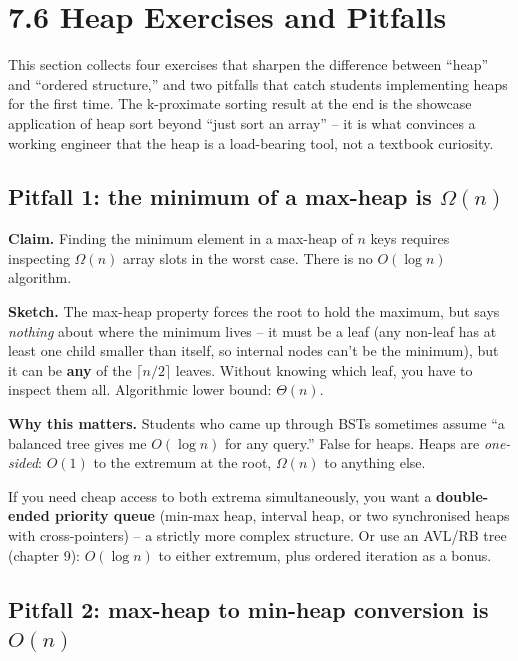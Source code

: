 \documentclass[11pt]{article}
\begin{document}
\section{7.6 Heap Exercises and Pitfalls}

This section collects four exercises that sharpen the difference
between ``heap'' and ``ordered structure,'' and two pitfalls that
catch students implementing heaps for the first time. The k-proximate
sorting result at the end is the showcase application of heap sort
beyond ``just sort an array'' -- it is what convinces a working
engineer that the heap is a load-bearing tool, not a textbook
curiosity.

\subsection*{Pitfall 1: the minimum of a max-heap is $\Omega(n)$}

\begin{warnbox}
\textbf{Claim.} Finding the minimum element in a max-heap of $n$ keys
requires inspecting $\Omega(n)$ array slots in the worst case. There
is no $O(\log n)$ algorithm.

\textbf{Sketch.} The max-heap property forces the root to hold the
maximum, but says \emph{nothing} about where the minimum lives -- it
must be a leaf (any non-leaf has at least one child smaller than
itself, so internal nodes can't be the minimum), but it can be
\textbf{any} of the $\lceil n/2 \rceil$ leaves. Without knowing
which leaf, you have to inspect them all. Algorithmic lower bound:
$\Theta(n)$.

\textbf{Why this matters.} Students who came up through BSTs
sometimes assume ``a balanced tree gives me $O(\log n)$ for any
query.'' False for heaps. Heaps are \emph{one-sided}: $O(1)$ to the
extremum at the root, $\Omega(n)$ to anything else.

If you need cheap access to both extrema simultaneously, you want a
\textbf{double-ended priority queue} (min-max heap, interval heap, or
two synchronised heaps with cross-pointers) -- a strictly more complex
structure. Or use an AVL/RB tree (chapter 9): $O(\log n)$ to either
extremum, plus ordered iteration as a bonus.
\end{warnbox}

\subsection*{Pitfall 2: max-heap to min-heap conversion is $O(n)$}
\end{document}
